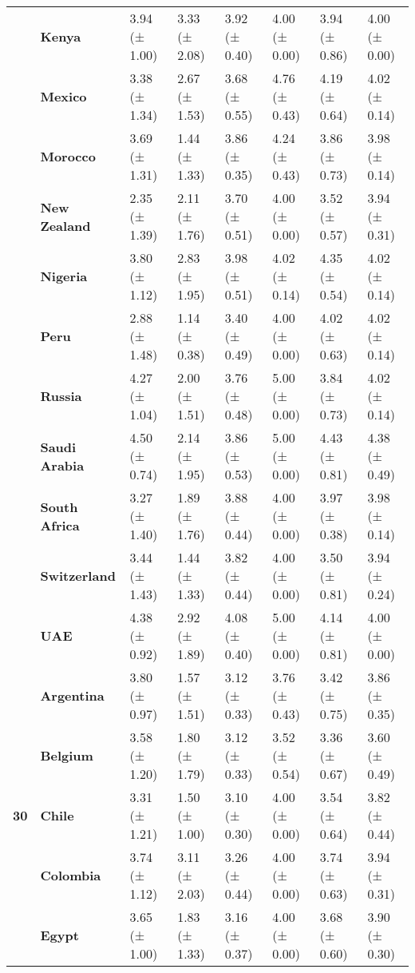 \begin{longtable}{llllllll}
\textbf{} & \textbf{Kenya} & 3.94 (± 1.00) & 3.33 (± 2.08) & 3.92 (± 0.40) & 4.00 (± 0.00) & 3.94 (± 0.86) & 4.00 (± 0.00) \\
\textbf{} & \textbf{Mexico} & 3.38 (± 1.34) & 2.67 (± 1.53) & 3.68 (± 0.55) & 4.76 (± 0.43) & 4.19 (± 0.64) & 4.02 (± 0.14) \\
\textbf{} & \textbf{Morocco} & 3.69 (± 1.31) & 1.44 (± 1.33) & 3.86 (± 0.35) & 4.24 (± 0.43) & 3.86 (± 0.73) & 3.98 (± 0.14) \\
\textbf{} & \textbf{New Zealand} & 2.35 (± 1.39) & 2.11 (± 1.76) & 3.70 (± 0.51) & 4.00 (± 0.00) & 3.52 (± 0.57) & 3.94 (± 0.31) \\
\textbf{} & \textbf{Nigeria} & 3.80 (± 1.12) & 2.83 (± 1.95) & 3.98 (± 0.51) & 4.02 (± 0.14) & 4.35 (± 0.54) & 4.02 (± 0.14) \\
\textbf{} & \textbf{Peru} & 2.88 (± 1.48) & 1.14 (± 0.38) & 3.40 (± 0.49) & 4.00 (± 0.00) & 4.02 (± 0.63) & 4.02 (± 0.14) \\
\textbf{} & \textbf{Russia} & 4.27 (± 1.04) & 2.00 (± 1.51) & 3.76 (± 0.48) & 5.00 (± 0.00) & 3.84 (± 0.73) & 4.02 (± 0.14) \\
\textbf{} & \textbf{Saudi Arabia} & 4.50 (± 0.74) & 2.14 (± 1.95) & 3.86 (± 0.53) & 5.00 (± 0.00) & 4.43 (± 0.81) & 4.38 (± 0.49) \\
\textbf{} & \textbf{South Africa} & 3.27 (± 1.40) & 1.89 (± 1.76) & 3.88 (± 0.44) & 4.00 (± 0.00) & 3.97 (± 0.38) & 3.98 (± 0.14) \\
\textbf{} & \textbf{Switzerland} & 3.44 (± 1.43) & 1.44 (± 1.33) & 3.82 (± 0.44) & 4.00 (± 0.00) & 3.50 (± 0.81) & 3.94 (± 0.24) \\
\textbf{} & \textbf{UAE} & 4.38 (± 0.92) & 2.92 (± 1.89) & 4.08 (± 0.40) & 5.00 (± 0.00) & 4.14 (± 0.81) & 4.00 (± 0.00) \\
\cline{1-8}
\multirow[t]{19}{*}{\textbf{30}} & \textbf{Argentina} & 3.80 (± 0.97) & 1.57 (± 1.51) & 3.12 (± 0.33) & 3.76 (± 0.43) & 3.42 (± 0.75) & 3.86 (± 0.35) \\
\textbf{} & \textbf{Belgium} & 3.58 (± 1.20) & 1.80 (± 1.79) & 3.12 (± 0.33) & 3.52 (± 0.54) & 3.36 (± 0.67) & 3.60 (± 0.49) \\
\textbf{} & \textbf{Chile} & 3.31 (± 1.21) & 1.50 (± 1.00) & 3.10 (± 0.30) & 4.00 (± 0.00) & 3.54 (± 0.64) & 3.82 (± 0.44) \\
\textbf{} & \textbf{Colombia} & 3.74 (± 1.12) & 3.11 (± 2.03) & 3.26 (± 0.44) & 4.00 (± 0.00) & 3.74 (± 0.63) & 3.94 (± 0.31) \\
\textbf{} & \textbf{Egypt} & 3.65 (± 1.00) & 1.83 (± 1.33) & 3.16 (± 0.37) & 4.00 (± 0.00) & 3.68 (± 0.60) & 3.90 (± 0.30) \\

\end{longtable}
